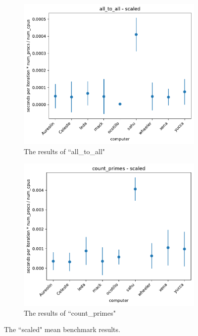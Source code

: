 \documentclass{article}
\begin{document}
\begin{figure}[h]
    \centering
    \begin{subfigure}[b]{0.49\textwidth}
         \centering
         \includegraphics[width=\textwidth]{figures/final/all_to_all_scaled.pdf}
         \caption{The results of ``all\_to\_all"}
         \label{fig:all_to_all}
     \end{subfigure}
     \hfill
     \begin{subfigure}[b]{0.49\textwidth}
         \centering
         \includegraphics[width=\textwidth]{figures/final/count_primes_scaled.pdf}
         \caption{The results of ``count\_primes"}
         \label{fig:normalized}
     \end{subfigure}
     \hfill
    \caption{The ``scaled" mean benchmark results. }
    \label{fig:scaled}
\end{figure}
\end{document}
